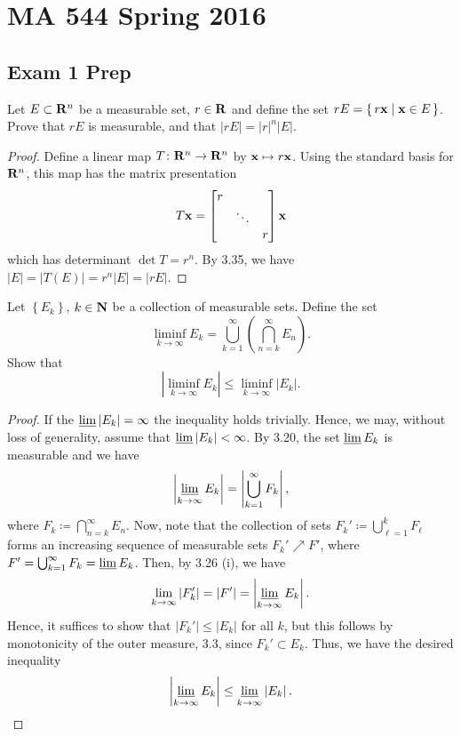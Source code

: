 \chapter{MA 544 Spring 2016}
\section{Exam 1 Prep}
\begin{problem}
Let $E\subset\mathbf{R}^n$ be a measurable set, $r\in\mathbf{R}$ and define the set
$rE=\left\{\,r\mathbf{x}\;\middle|\;\mathbf{x}\in E\,\right\}$. Prove that $rE$ is
measurable, and that $|rE|=|r|^n|E|$.
\end{problem}
\begin{proof}
Define a linear map $T\colon\mathbf{R}^n\to\mathbf{R}^n$ by $\mathbf{x}\mapsto r\mathbf{x}$. Using
the standard basis for $\mathbf{R}^n$, this map has the matrix presentation
\begin{equation}
\label{eq:matrix-presentation}
T\mathbf{x}=
\begin{bmatrix}
r&\\
&\ddots\\
&&r
\end{bmatrix}\mathbf{x}
\end{equation}
which has determinant $\det T=r^n$. By 3.35, we have
$|E|=|T(E)|=r^n|E|=|rE|$.
\end{proof}

\begin{problem}
Let $\left\{ E_k \right\}$, $k\in\mathbf{N}$ be a collection of measurable
sets. Define the set
\[
\liminf_{k\to\infty} E_k
=\bigcup_{k=1}^\infty\left(\bigcap_{n=k}^\infty E_n\right).
\]
Show that
\[
\left|\liminf_{k\to\infty} E_k\right|\leq\liminf_{k\to\infty}\left|E_k\right|.
\]
\end{problem}
\begin{proof}
If the $\varliminf\left|E_k\right|=\infty$ the inequality holds
trivially. Hence, we may, without loss of generality, assume that
$\varliminf\left|E_k\right|<\infty$. By 3.20, the set $\varliminf E_k$ is
measurable and we have
\begin{equation}
  \label{eq:limsup-rewrite}
\left|\varliminf_{k\to\infty} E_k\right|
=\left|\bigcup_{k=1}^\infty F_k\right|,
\end{equation}
where $F_k\coloneqq\bigcap_{n=k}^\infty E_n$. Now, note that the collection
of sets $F_k'\coloneqq\bigcup_{\ell=1}^k F_\ell$ forms an increasing
sequence of measurable sets $F_k'\nearrow F'$, where
$F'=\bigcup_{k=1}^\infty F_k=\varliminf E_k$. Then, by 3.26 (i), we have
\begin{equation}
  \label{eq:monotone-increasing-limit}
\lim_{k\to\infty}\left|F_k'\right|
=\left|F'\right|
=\left|\varliminf_{k\to\infty} E_k\right|.
\end{equation}
Hence, it suffices to show that $\left|F_k'\right|\leq\left|E_k\right|$ for
all $k$, but this follows by monotonicity of the outer measure, 3.3, since
$F_k'\subset E_k$. Thus, we have the desired inequality
\begin{equation}
  \label{eq:meas-liminf-liminf-meas}
\left|\varliminf_{k\to\infty} E_k\right|
\leq\varliminf_{k\to\infty}\left|E_k\right|.
\end{equation}
\end{proof}

